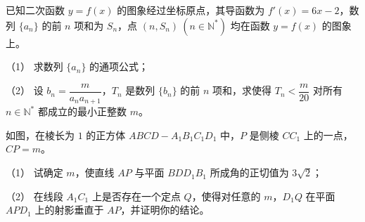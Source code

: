 \begin{question}
已知二次函数 $y=f(x)$ 的图象经过坐标原点，其导函数为 $f'(x)=6x-2$，数列 $\{a_n\}$ 的前 $n$ 项和为 $S_n$，点 $(n,S_n)\ (n\in\mathbb N^*)$ 均在函数 $y=f(x)$ 的图象上。

（1） 求数列 $\{a_n\}$ 的通项公式；

（2） 设 $b_n=\dfrac{m}{a_na_{n+1}}$，$T_n$ 是数列 $\{b_n\}$ 的前 $n$ 项和，求使得 $T_n<\dfrac{m}{20}$ 对所有 $n\in\mathbb N^*$ 都成立的最小正整数 $m$。

\Needspace{0.4\textheight}
\end{question}
\begin{question}
如图，在棱长为 $1$ 的正方体 $ABCD-A_1B_1C_1D_1$ 中，$P$ 是侧棱 $CC_1$ 上的一点，$CP=m$。

（1） 试确定 $m$，使直线 $AP$ 与平面 $BDD_1B_1$ 所成角的正切值为 $3\sqrt2$；

（2） 在线段 $A_1C_1$ 上是否存在一个定点 $Q$，使得对任意的 $m$，$D_1Q$ 在平面 $APD_1$ 上的射影垂直于 $AP$，并证明你的结论。
\nopagebreak[4]
\begin{center}\end{center}
\nopagebreak[4]
\end{question}
